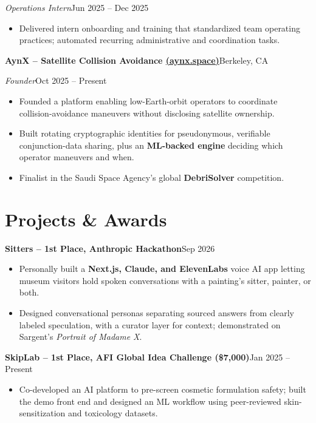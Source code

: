 \documentclass[a4paper,10pt]{article}
\newcommand{\entry}[4]{%
  \textbf{#1}\hfill #2\par
  \textit{#3}\hfill #4\par
}
\newcommand{\project}[2]{\textbf{#1}\hfill #2\par}
\begin{document}
\textit{Operations Intern}\hfill Jun 2025 -- Dec 2025\par
\begin{itemize}
  \item Delivered intern onboarding and training that standardized team operating practices; automated recurring administrative and coordination tasks.
\end{itemize}
\entry{AynX -- Satellite Collision Avoidance \;\href{https://aynx.space}{(aynx.space)}}{Berkeley, CA}
{Founder}{Oct 2025 -- Present}
\begin{itemize}
  \item Founded a platform enabling low-Earth-orbit operators to coordinate collision-avoidance maneuvers without disclosing satellite ownership.
  \item Built rotating cryptographic identities for pseudonymous, verifiable conjunction-data sharing, plus an \textbf{ML-backed engine} deciding which operator maneuvers and when.
  \item Finalist in the Saudi Space Agency's global \textbf{DebriSolver} competition.
\end{itemize}
\section{Projects \& Awards}
\project{Sitters -- 1st Place, Anthropic Hackathon}{Sep 2026}
\begin{itemize}
  \item Personally built a \textbf{Next.js, Claude, and ElevenLabs} voice AI app letting museum visitors hold spoken conversations with a painting's sitter, painter, or both.
  \item Designed conversational personas separating sourced answers from clearly labeled speculation, with a curator layer for context; demonstrated on Sargent's \textit{Portrait of Madame X}.
\end{itemize}
\project{SkipLab -- 1st Place, AFI Global Idea Challenge (\$7,000)}{Jan 2025 -- Present}
\begin{itemize}
  \item Co-developed an AI platform to pre-screen cosmetic formulation safety; built the demo front end and designed an ML workflow using peer-reviewed skin-sensitization and toxicology datasets.
\end{itemize}
\end{document}
